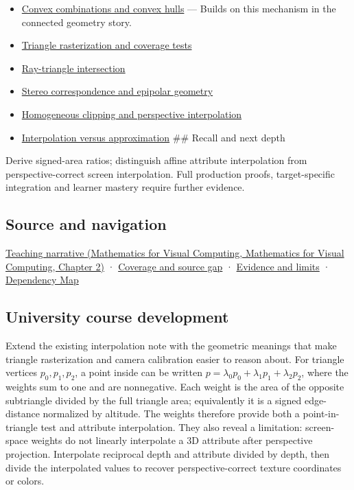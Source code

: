 \begin{itemize}
\item
  \hyperref[appendix-0026ec42c9d5]{Convex combinations and convex hulls} --- Builds on this mechanism in the connected geometry story.
\item
  \hyperref[appendix-ed3f9bc298fe]{Triangle rasterization and coverage tests}
\item
  \hyperref[appendix-47ac1bd6d144]{Ray-triangle intersection}
\item
  \hyperref[appendix-c4e98b6e4001]{Stereo correspondence and epipolar geometry}
\item
  \hyperref[appendix-40426e4b2103]{Homogeneous clipping and perspective interpolation}
\item
  \hyperref[appendix-0c2a5f69851e]{Interpolation versus approximation} \#\# Recall and next depth
\end{itemize}

Derive signed-area ratios; distinguish affine attribute interpolation from perspective-correct screen interpolation. Full production proofs, target-specific integration and learner mastery require further evidence.

\subsection{Source and navigation}\label{appendix-02b9d9a81dca-source-and-navigation}

\href{../02-Mathematics-for-Visual-Computing/main.pdf\#nameddest=01-foundations-i-ch018-the-sensor-needs-coordinates-inside-the-triangle}{Teaching narrative (Mathematics for Visual Computing, Mathematics for Visual Computing, Chapter 2)} · \hyperref[appendix-fd090d982a15-phase-6---parts-501-600]{Coverage and source gap} · \hyperref[appendix-a103e7846d21-phase-6---source-analysis-and-verification]{Evidence and limits} · \hyperref[appendix-4ad47bdd269a]{Dependency Map}

\subsection{University course development}\label{appendix-02b9d9a81dca-university-course-development}

Extend the existing interpolation note with the geometric meanings that make triangle rasterization and camera calibration easier to reason about. For triangle vertices \(p_0,p_1,p_2\), a point inside can be written \(p=\lambda_0p_0+\lambda_1p_1+\lambda_2p_2\), where the weights sum to one and are nonnegative. Each weight is the area of the opposite subtriangle divided by the full triangle area; equivalently it is a signed edge-distance normalized by altitude. The weights therefore provide both a point-in-triangle test and attribute interpolation. They also reveal a limitation: screen-space weights do not linearly interpolate a 3D attribute after perspective projection. Interpolate reciprocal depth and attribute divided by depth, then divide the interpolated values to recover perspective-correct texture coordinates or colors.

